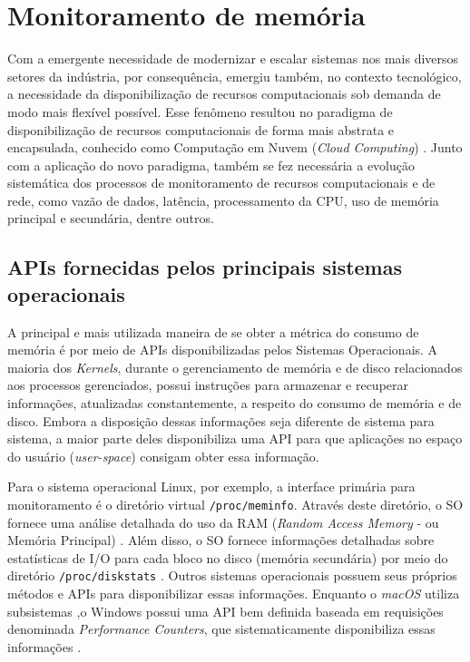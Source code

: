 \section{Monitoramento de memória}

Com a emergente necessidade de modernizar e escalar sistemas nos mais diversos setores da indústria, por consequência, emergiu também, no contexto tecnológico, a necessidade da disponibilização de recursos computacionais sob demanda de modo mais flexível possível. Esse fenômeno resultou no paradigma de disponibilização de recursos computacionais de forma mais abstrata e encapsulada, conhecido como Computação em Nuvem (\textit{Cloud Computing}) \cite{boss2007cloud}. Junto com a aplicação do novo paradigma, também se fez necessária a evolução sistemática dos processos de monitoramento de recursos computacionais e de rede, como vazão de dados, latência, processamento da CPU, uso de memória principal e secundária, dentre outros.

\subsection{APIs fornecidas pelos principais sistemas operacionais}

A principal e mais utilizada maneira de se obter a métrica do consumo de memória é por meio de APIs disponibilizadas pelos Sistemas Operacionais. A maioria dos \textit{Kernels}, durante o gerenciamento de memória e de disco relacionados aos processos gerenciados, possui instruções para armazenar e recuperar informações, atualizadas constantemente, a respeito do consumo de memória e de disco. Embora a disposição dessas informações seja diferente de sistema para sistema, a maior parte deles disponibiliza uma API para que aplicações no espaço do usuário (\textit{user-space}) consigam obter essa informação.

Para o sistema operacional Linux, por exemplo, a interface primária para monitoramento é o diretório virtual \texttt{/proc/meminfo}. Através deste diretório, o SO fornece uma análise detalhada do uso da RAM (\textit{Random Access Memory} - ou Memória Principal) \cite{linux_procfs_doc}. Além disso, o SO fornece informações detalhadas sobre estatísticas de I/O para cada bloco no disco (memória secundária) por meio do diretório \texttt{/proc/diskstats} \cite{linux_iostats_doc}. Outros sistemas operacionais possuem seus próprios métodos e APIs para disponibilizar essas informações. Enquanto o \textit{macOS} utiliza subsistemas \cite{macos_iokit_doc} \cite{macos_virtmem_doc},o Windows possui uma API bem definida baseada em requisições denominada \textit{Performance Counters}, que sistematicamente disponibiliza essas informações \cite{windows_disk_counters} \cite{windows_mem_counters}.

